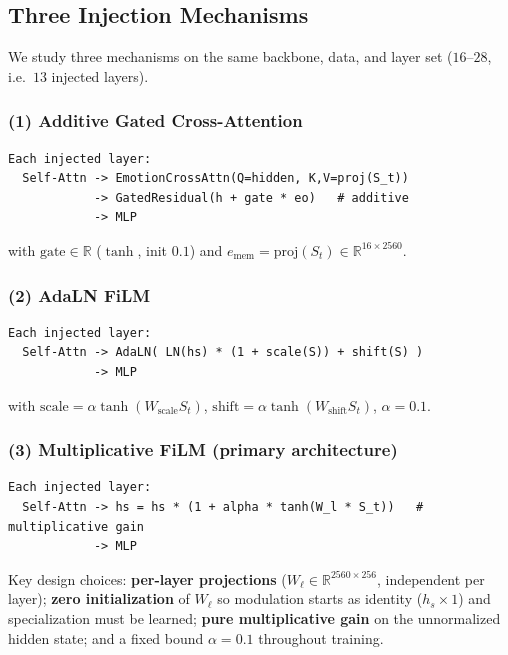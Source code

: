 \documentclass[11pt,a4paper]{article}
\newcommand{\R}{\mathbb{R}}
\newcommand{\St}{S_t}
\begin{document}
\subsection{Three Injection Mechanisms}

We study three mechanisms on the same backbone, data, and layer set ($16$--$28$,
i.e.\ $13$ injected layers).

\subsubsection*{(1) Additive Gated Cross-Attention}

\begin{lstlisting}
Each injected layer:
  Self-Attn -> EmotionCrossAttn(Q=hidden, K,V=proj(S_t))
            -> GatedResidual(h + gate * eo)   # additive
            -> MLP
\end{lstlisting}
with $\mathrm{gate}\in\R$ ($\tanh$, init $0.1$) and $e_{\mathrm{mem}}=\mathrm{proj}(\St)\in\R^{16\times2560}$.

\subsubsection*{(2) AdaLN FiLM}

\begin{lstlisting}
Each injected layer:
  Self-Attn -> AdaLN( LN(hs) * (1 + scale(S)) + shift(S) )
            -> MLP
\end{lstlisting}
with $\mathrm{scale}=\alpha\tanh(W_{\mathrm{scale}}\St)$, $\mathrm{shift}=\alpha\tanh(W_{\mathrm{shift}}\St)$, $\alpha=0.1$.

\subsubsection*{(3) Multiplicative FiLM (primary architecture)}

\begin{lstlisting}
Each injected layer:
  Self-Attn -> hs = hs * (1 + alpha * tanh(W_l * S_t))   # multiplicative gain
            -> MLP
\end{lstlisting}

Key design choices: \textbf{per-layer projections} ($W_\ell\in\R^{2560\times256}$,
independent per layer); \textbf{zero initialization} of $W_\ell$ so modulation starts
as identity ($h_s\times1$) and specialization must be learned; \textbf{pure
multiplicative gain} on the unnormalized hidden state; and a fixed bound $\alpha=0.1$
throughout training.
\end{document}
